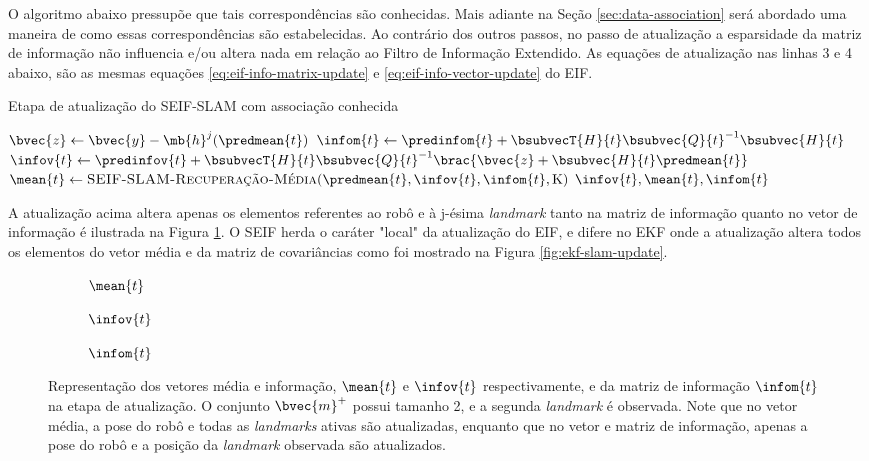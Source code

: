 O algoritmo abaixo pressupõe que tais correspondências são 
conhecidas. Mais adiante na Seção \ref{sec:data-association} será 
abordado uma maneira de como essas correspondências são estabelecidas. 
Ao contrário dos outros passos, no passo de atualização a esparsidade da 
matriz de informação não influencia e/ou altera nada em relação ao 
Filtro de Informação Extendido. As equações de atualização nas linhas 
3 e 4 abaixo, são as mesmas equações \ref{eq:eif-info-matrix-update} e 
\ref{eq:eif-info-vector-update} do EIF.

\begin{algorithm}[h]
  \caption{Etapa de atualização do SEIF-SLAM com associação conhecida}
  \label{alg:seif-slam-update-known-associations}
\begin{algorithmic}[1]
  \State $\bvec{z} \gets \bvec{y} - \mb{h}^j(\predmean{t})$
  \State $\infom{t} \gets \predinfom{t} + \bsubvecT{H}{t} \bsubvec{Q}{t}^{-1} \bsubvec{H}{t}$
  \State $\infov{t} \gets \predinfov{t} + \bsubvecT{H}{t}\bsubvec{Q}{t}^{-1} 
  \brac{\bvec{z} + \bsubvec{H}{t}\predmean{t}}$
  \State $\mean{t} \gets \textproc{SEIF-SLAM-Recuperação-Média}(\predmean{t}, \infov{t}, \infom{t}, \mathrm{K})$
  \State \Return $\infov{t}, \mean{t}, \infom{t}$
  \EndProcedure
\end{algorithmic}
\end{algorithm}

A atualização acima altera apenas os elementos referentes ao robô e à 
j-ésima \textit{landmark} tanto na matriz de informação quanto no vetor 
de informação é ilustrada na Figura \ref{fig:seif-slam-update}. O SEIF 
herda o caráter "local" da atualização do EIF, e difere no EKF onde a 
atualização altera todos os elementos do vetor média e da matriz de 
covariâncias como foi mostrado na Figura \ref{fig:ekf-slam-update}.
\begin{figure}[h]
  \begin{subfigure}{.30\textwidth}
    
    \caption{$\mean{t}$}
  \end{subfigure}
  \hfill
  \begin{subfigure}{.30\textwidth}
    
    \caption{$\infov{t}$}
  \end{subfigure}
  \hfill
  \begin{subfigure}{.3\textwidth}
    
    \caption{$\infom{t}$}
  \end{subfigure}
  \caption{Representação dos vetores média e informação, $\mean{t}$ e $\infov{t}$ respectivamente, e da matriz de informação $\infom{t}$ na 
  etapa de atualização. O conjunto $\bvec{m}^+$ possui tamanho 2, e a 
  segunda \textit{landmark} é observada. Note que no vetor média, 
  a pose do robô e todas as \textit{landmarks} ativas são atualizadas, 
  enquanto que no vetor e matriz de informação, apenas a pose do robô e 
  a posição da \textit{landmark} observada são atualizados.}
  \label{fig:seif-slam-update}
\end{figure}

